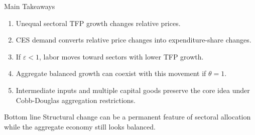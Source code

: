 \begin{frame}{Main Takeaways}
  \small
  \begin{enumerate}
    \item Unequal sectoral TFP growth changes relative prices.
    \item CES demand converts relative price changes into expenditure-share changes.
    \item If $\varepsilon<1$, labor moves toward sectors with lower TFP growth.
    \item Aggregate balanced growth can coexist with this movement if $\theta=1$.
    \item Intermediate inputs and multiple capital goods preserve the core idea
      under Cobb-Douglas aggregation restrictions.
  \end{enumerate}

  \vspace{0.25cm}
  \begin{alertblock}{Bottom line}
    Structural change can be a permanent feature of sectoral allocation while
    the aggregate economy still looks balanced.
  \end{alertblock}
\end{frame}
